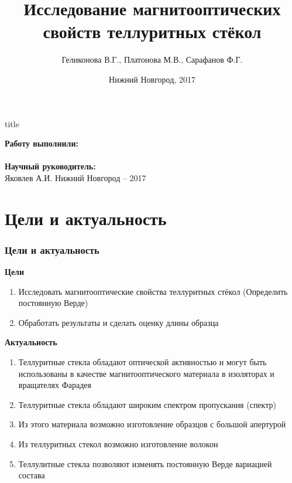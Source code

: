 \documentclass[10pt,pdf,hyperref={unicode}, dvipsnames, handout]{beamer}
\begin{document}
  

\title[Магнитооптическая активность теллуритных стёкол]{Исследование магнитооптических свойств теллуритных стёкол}
\author{%
	Геликонова В.Г., %
	Платонова М.В., %
	Сарафанов Ф.Г. %
}
\date{Нижний Новгород, 2017}

\begin{frame}[plain]
	\centering
	\vspace{2cm}
	\begin{beamercolorbox}[sep=8pt,center]{title}
		\bf{}\inserttitle
	\end{beamercolorbox}
	\vspace{0.5cm}
	\normalsize \textbf{Работу выполнили:}\\
	\large\insertauthor\\ 
	\vspace{0.5cm}
	\normalsize{\textbf{Научный руководитель:}\\}
	\large{Яковлев А.И.}
	\vfill
	\small{Нижний Новгород -- 2017}
\end{frame}
\section{Цели и актуальность}
\begin{frame}[t]
	\frametitle{Цели и актуальность}
	\textbf{Цели}\\
	\begin{enumerate}
		\item Исследовать магнитооптические свойства теллуритных стёкол (Определить постоянную Верде)
		\item Обработать результаты и сделать оценку длины образца
	\end{enumerate}
	\textbf{Актуальность}\\
	\begin{enumerate}
		\item Теллуритные стекла обладают оптической активностью и могут быть использованы в качестве магнитооптического материала в изоляторах и вращателях Фарадея
		\item Теллуритные стекла обладают широким спектром пропускания (спектр)
		\item Из этого материала возможно изготовление образцов с большой апертурой
		\item Из теллуритных стекол возможно изготовление волокон
		\item Теллулитные стекла позволяют изменять постоянную Верде вариацией состава
	\end{enumerate}
\end{frame}
\end{document}
